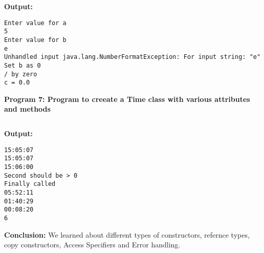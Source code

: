 \documentclass{book}
\begin{document}
\inputminted{java}{ExceptionHandling.java}
\par
\textbf{Output:}
\begin{verbatim}
Enter value for a
5
Enter value for b
e
Unhandled input java.lang.NumberFormatException: For input string: "e"
Set b as 0
/ by zero
c = 0.0
\end{verbatim}
\par
\textbf{Program 7: Program to creeate a Time class with various attributes and methods}
\\

\inputminted{java}{Lab2.java}
\textbf{Output:}
\begin{verbatim}
15:05:07
15:05:07
15:06:00
Second should be > 0
Finally called
05:52:11
01:40:29
00:08:20
6
\end{verbatim}
\par
\textbf{Conclusion:} We learned about different types of constructors, refernce types, copy constructors, Access Specifiers and Error handling.
\par
\end{document}
